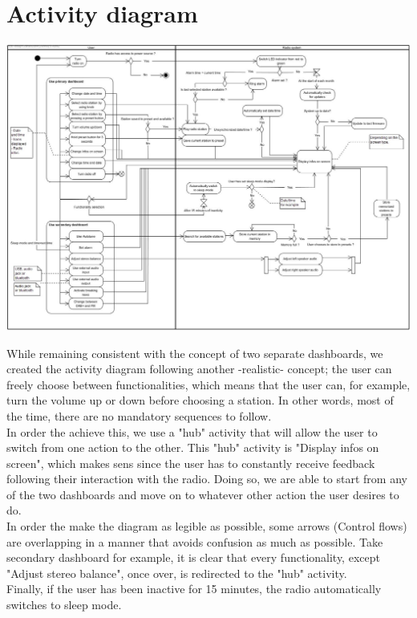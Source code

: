\documentclass[11pt]{article}
\begin{document}
\section{Activity diagram}
\vspace{10px}
\begin{center}
\includegraphics[width=16.5cm]{../Diagrams/Activity-v5.jpg}\\
\end{center}
While remaining consistent with the concept of two separate dashboards, we created the activity diagram following another -realistic- concept; the user can freely choose between functionalities, which means that the user can, for example, turn the volume up or down before choosing a station. In other words, most of the time, there are no mandatory sequences to follow.\\
In order the achieve this, we use a "hub" activity that will allow the user to switch from one action to the other. This "hub" activity is  "Display infos on screen", which makes sens since the user has to constantly receive feedback following their interaction with the radio. Doing so, we are able to start from any of the two dashboards and move on to whatever other action the user desires to do.\\
In order the make the diagram as legible as possible, some arrows (Control flows) are overlapping in a manner that avoids confusion as much as possible. Take secondary dashboard for example, it is clear that every functionality, except "Adjust stereo balance", once over, is redirected to the "hub" activity.\\
Finally, if the user has been inactive for 15 minutes, the radio automatically switches to sleep mode.
\end{document}
